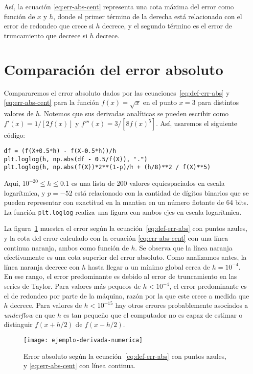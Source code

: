\documentclass[../portafolio.tex]{subfiles}
\begin{document}
Así, la ecuación \eqref{eq:err-abs-cent} representa una cota máxima del error como función de $x$ y $h$, donde el primer término de la derecha está relacionado con el error de redondeo que crece si $h$ decrece, y el segundo término es el error de truncamiento que decrece si $h$ decrece.

\section{Comparación del error absoluto}
Compararemos el error absoluto dados por las ecuaciones~\eqref{eq:def-err-abs} y \eqref{eq:err-abs-cent} para la función $f(x)=\sqrt{x}$ en el punto $x=3$ para distintos valores de $h$. Notemos que sus derivadas analíticas se pueden escribir como $f'(x)=1/[2f(x)]$ y $f'''(x) = 3/[8 f(x)^5]$. Así, usaremos el siguiente código:
\begin{verbatim}
df = (f(X+0.5*h) - f(X-0.5*h))/h
plt.loglog(h, np.abs(df - 0.5/f(X)), ".")
plt.loglog(h, np.abs(f(X))*2**(1-p)/h + (h/8)**2 / f(X)**5)
\end{verbatim}

Aquí, $10^{-20}\leq h\leq 0.1$ es una lista de 200 valores equiespaciados en escala logarítmica, y $p=-52$ está relacionado con la cantidad de dígitos binarios que se pueden representar con exactitud en la mantisa en un número flotante de 64 bits. La función \texttt{plt.loglog} realiza una figura con ambos ejes en escala logarítmica.

La figura~\ref{fig:ejemplo_derivada_numerica} muestra el error según
la ecuación~\eqref{eq:def-err-abs} con puntos azules, y la cota del
error calculado con la ecuación \eqref{eq:err-abs-cent} con una línea
continua naranja, ambos como función de $h$. Se observa que la línea naranja efectivamente es una cota superior del error absoluto. Como analizamos antes, la línea naranja decrece con $h$ hasta llegar a un mínimo global cerca de $h=10^{-4}$. En ese rango, el error predominante es debido al error de truncamiento en las series de Taylor. Para valores más pequeos de $h<10^{-4}$, el error predominante es el de redondeo por parte de la máquina, razón por la que este crece a medida que $h$ decrece. Para valores de $h<10^{-15}$ hay otros errores probablemente asociados a \textit{underflow} en que $h$ es tan pequeño que el computador no es capaz de estimar o distinguir $f(x+h/2)$ de $f(x-h/2)$. 
\begin{figure}[ht!]
  \centering
  \texttt{[image: ejemplo-derivada-numerica]}
  \caption{Error absoluto según la ecuación~\eqref{eq:def-err-abs} con puntos azules, y \eqref{eq:err-abs-cent} con línea continua.}
  \label{fig:ejemplo_derivada_numerica}
\end{figure}
\end{document}
